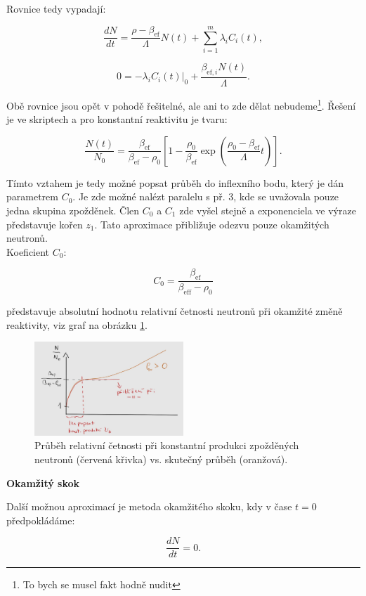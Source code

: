 Rovnice tedy vypadají:

$$ \dfrac{dN}{dt} = \dfrac{\rho - \beta_{\text{ef}}}{\Lambda} N(t) + \sum_{i=1}^m \lambda_i C_i(t), $$

$$ 0 = -\lambda_i C_i(t) |_{0} + \dfrac{\beta_{\text{ef},i}  N(t)}{\Lambda}. $$

Obě rovnice jsou opět v pohodě řešitelné, ale ani to zde dělat nebudeme\footnote{To bych se musel fakt hodně nudit}. Řešení je ve skriptech a pro konstantní reaktivitu je tvaru:

$$ \dfrac{N(t)}{N_0} = \dfrac{\beta_{\text{ef}}}{\beta_{\text{ef}}-\rho_0} \left [ 1 - \dfrac{\rho_0}{\beta_{\text{ef}}} \exp{ \left ( \dfrac{\rho_0 - \beta_{\text{ef}}}{\Lambda}t \right ) } \right ]. $$

Tímto vztahem je tedy možné popsat průběh do inflexního bodu, který je dán parametrem $C_0$. Je zde možné nalézt paralelu s př. 3, kde se uvažovala pouze jedna skupina zpožděnek. Člen $C_0$ a $C_1$ zde vyšel stejně a exponenciela ve výraze představuje kořen $z_1$. Tato aproximace přibližuje odezvu pouze okamžitých neutronů.\\

Koeficient $C_0$:

$$ C_0 = \dfrac{\beta_{\text{ef}}}{\beta_{\text{eff}} - \rho_0} $$

představuje absolutní hodnotu relativní četnosti neutronů při okamžité změně reaktivity, viz graf na obrázku \ref{fig_konstantni_produkce}.

\begin{figure}[H]
  \centering
  \includegraphics[width=0.5\textwidth]{img/konstantni_produkce.jpg}
  \caption{Průběh relativní četnosti při konstantní produkci zpožděných neutronů (červená křivka) vs. skutečný průběh (oranžová).}
  \label{fig_konstantni_produkce}
\end{figure}

\textbf{Okamžitý skok}

Další možnou aproximací je metoda okamžitého skoku, kdy v čase $t = 0$ předpokládáme:

$$ \dfrac{dN}{dt} = 0. $$

